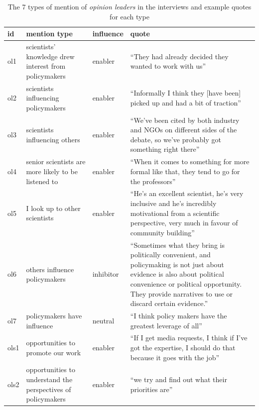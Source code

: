\begin{table}[!ht]
\footnotesize
\caption{The 7 types of mention of \emph{opinion leaders} in the interviews and example quotes for each type}\label{tab:resopinionleaders}
\begin{tabular}{p{.08\linewidth}p{.3\linewidth}p{.1\linewidth}p{.42\linewidth}}\hline
id & mention type & influence & quote \\ \hline \hline 
ol1 & scientists' knowledge   drew interest from policymakers & enabler & ``They had already decided they wanted to   work with us''\index{p05}  \\[5mm]
ol2 & scientists influencing policymakers & enabler & ``Informally I think they [have been] picked up and had a bit of   traction''\index{p03}  \\[5mm]
ol3 & scientists influencing others & enabler & ``We've been cited by both industry and NGOs on different sides of   the debate, so we've probably got something right there''\index{p01} \\[5mm]
ol4 & senior scientists are more likely to be   listened to & enabler & ``When it comes to something for more formal like that, they tend to   go for the professors''\index{p03} \\[5mm]
ol5 & I look up to other scientists & enabler & ``He's an excellent scientist, he's very inclusive and he's   incredibly motivational from a scientific perspective, very much in favour of   community building''\index{p04} \\[5mm]
ol6 & others influence policymakers & inhibitor & ``Sometimes what they bring is politically convenient, and   policymaking is not just about evidence is also about political convenience   or political opportunity. They provide narratives to use or discard certain   evidence.''\index{p09}  \\[5mm]
ol7 & policymakers have influence & neutral & ``I think policy makers have the greatest leverage of   all''\index{p08}  \\[5mm] \hline
ols1 & opportunities to promote our work & enabler & ``If I get media requests, I think if I've got the expertise, I   should do that because it goes with the job''\index{p01}  \\[5mm]
ols2 &  opportunities to understand the perspectives of policymakers & enabler & ``we try and find out what their priorities are''\index{p12} \\ \hline
\end{tabular}
\end{table}

